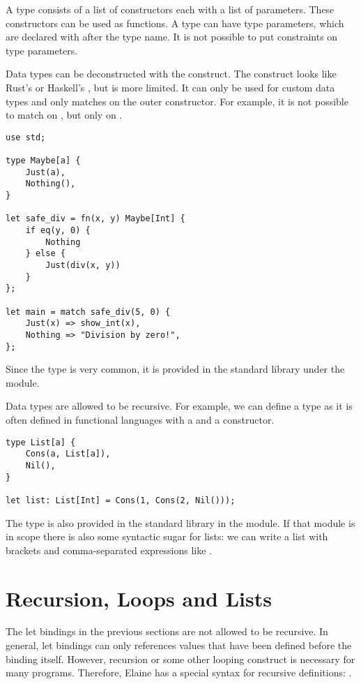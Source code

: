 A type consists of a list of constructors each with a list of parameters. These constructors can be used as functions. A type can have type parameters, which are declared with \el{[]} after the type name. It is not possible to put constraints on type parameters.

Data types can be deconstructed with the  construct. The  construct looks like Rust's  or Haskell's , but is more limited. It can only be used for custom data types and only matches on the outer constructor. For example, it is not possible to match on , but only on .

\begin{lstlisting}[language=elaine,style=fancy]
use std;

type Maybe[a] {
    Just(a),
    Nothing(),
}

let safe_div = fn(x, y) Maybe[Int] {
    if eq(y, 0) {
        Nothing
    } else {
        Just(div(x, y))
    }
};

let main = match safe_div(5, 0) {
    Just(x) => show_int(x),
    Nothing => "Division by zero!",
};
\end{lstlisting}

Since the  type is very common, it is provided in the standard library under the  module.

Data types are allowed to be recursive. For example, we can define a  type as it is often defined in functional languages with a  and a  constructor.

\begin{lstlisting}[language=elaine,style=fancy]
type List[a] {
    Cons(a, List[a]),
    Nil(),
}

let list: List[Int] = Cons(1, Cons(2, Nil()));
\end{lstlisting}

The  type is also provided in the standard library in the  module. If that module is in scope there is also some syntactic sugar for lists: we can write a list with brackets and comma-separated expressions like \el{[1, 2, 3]}.

\section{Recursion, Loops and Lists}\label{sec:recursion}

The let bindings in the previous sections are not allowed to be recursive. In general, let bindings can only references values that have been defined before the binding itself. However, recursion or some other looping construct is necessary for many programs. Therefore, Elaine has a special syntax for recursive definitions: .

